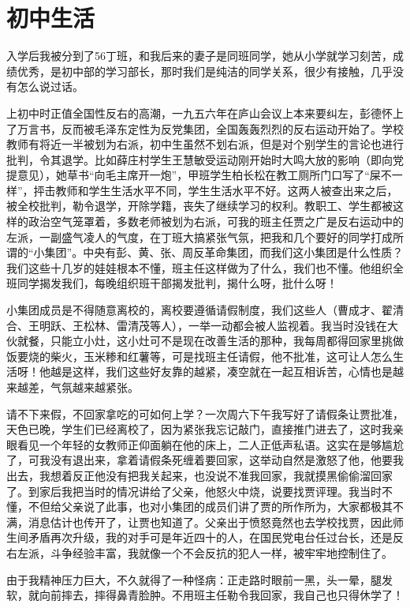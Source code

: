 \chapter{初中生活}

入学后我被分到了56丁班，和我后来的妻子是同班同学，她从小学就学习刻苦，成绩优秀，是初中部的学习部长，那时我们是纯洁的同学关系，很少有接触，几乎没有怎么说过话。

上初中时正值全国性反右的高潮，一九五六年在庐山会议上本来要纠左，彭德怀上了万言书，反而被毛泽东定性为反党集团，全国轰轰烈烈的反右运动开始了。学校教师有将近一半被划为右派，初中生虽然不划右派，但是对个别学生的言论也进行批判，令其退学。比如薛庄村学生王慧敏受运动刚开始时大鸣大放的影响（即向党提意见），她草书“向毛主席开一炮”，甲班学生柏长松在教工厕所门口写了“屎不一样”，抨击教师和学生生活水平不同，学生生活水平不好。这两人被查出来之后，被全校批判，勒令退学，开除学籍，丧失了继续学习的权利。教职工、学生都被这样的政治空气笼罩着，多数老师被划为右派，可我的班主任贾之广是反右运动中的左派，一副盛气凌人的气度，在丁班大搞紧张气氛，把我和几个要好的同学打成所谓的“小集团”。中央有彭、黄、张、周反革命集团，而我们这小集团是什么性质？我们这些十几岁的娃娃根本不懂，班主任这样做为了什么，我们也不懂。他组织全班同学揭发我们，每晚组织班干部揭发批判，揭什么呀，批什么呀！

小集团成员是不得随意离校的，离校要遵循请假制度，我们这些人（曹成才、翟清合、王明跃、王松林、雷清茂等人），一举一动都会被人监视着。我当时没钱在大伙就餐，只能立小灶，这小灶可不是现在改善生活的那种，我每周都得回家里挑做饭要烧的柴火，玉米糁和红薯等，可是找班主任请假，他不批准，这可让人怎么生活呀！他越是这样，我们这些好友靠的越紧，凑空就在一起互相诉苦，心情也是越来越差，气氛越来越紧张。

请不下来假，不回家拿吃的可如何上学？一次周六下午我写好了请假条让贾批准，天色已晚，学生们已经离校了，因为紧张我忘记敲门，直接推门进去了，这时我亲眼看见一个年轻的女教师正仰面躺在他的床上，二人正低声私语。这实在是够尴尬了，可我没有退出来，拿着请假条死缠着要回家，这举动自然是激怒了他，他要我出去，我想着反正他没有把我关起来，也没说不准我回家，我就摸黑偷偷溜回家了。到家后我把当时的情况讲给了父亲，他怒火中烧，说要找贾评理。我当时不懂，不但给父亲说了此事，也对小集团的成员们讲了贾的所作所为，大家都极其不满，消息估计也传开了，让贾也知道了。父亲出于愤怒竟然也去学校找贾，因此师生间矛盾再次升级，我的对手可是年近四十的人，在国民党电台任过台长，还是反右左派，斗争经验丰富，我就像一个不会反抗的犯人一样，被牢牢地控制住了。

由于我精神压力巨大，不久就得了一种怪病：正走路时眼前一黑，头一晕，腿发软，就向前摔去，摔得鼻青脸肿。不用班主任勒令我回家，我自己也只得休学了！

